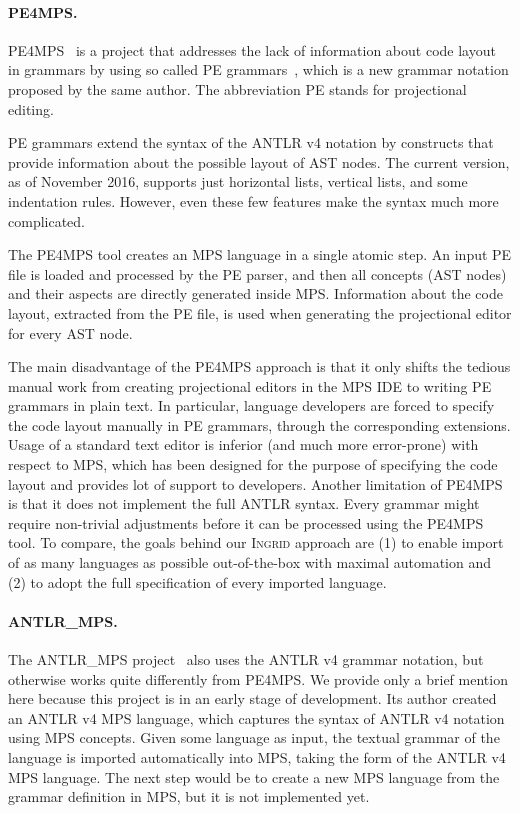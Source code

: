 \paragraph{PE4MPS.}
PE4MPS~\cite{ref:PE4MPS} is a project that addresses the lack of information about code layout in grammars by using so called PE grammars~\cite{ref:PE}, which is a new grammar notation proposed by the same author.
The abbreviation PE stands for projectional editing.

PE grammars extend the syntax of the ANTLR v4 notation by constructs that provide information about the possible layout of AST nodes.
 The current version, as of November 2016, supports just horizontal lists, vertical lists, and some indentation rules.
However, even these few features make the syntax much more complicated.

The PE4MPS tool creates an MPS language in a single atomic step.
An input PE file is loaded and processed by the PE parser, and then all concepts (AST nodes) and their aspects are directly generated inside MPS.
Information about the code layout, extracted from the PE file, is used when generating the projectional editor for every AST node.

The main disadvantage of the PE4MPS approach is that it only shifts the tedious manual work from creating projectional editors in the MPS IDE to writing PE grammars in plain text.
In particular, language developers are forced to specify the code layout manually in PE grammars, through the corresponding extensions.
Usage of a standard text editor is inferior (and much more error-prone) with respect to MPS, which has been designed for the purpose of specifying the code layout and provides lot of support to developers.
Another limitation of PE4MPS is that it does not implement the full ANTLR syntax.
Every grammar might require non-trivial adjustments before it can be processed using the PE4MPS tool.
To compare, the goals behind our \textsc{Ingrid} approach are (1) to enable import of as many languages as possible out-of-the-box with maximal automation and (2) to adopt the full specification of every imported language.

\paragraph{ANTLR{\_}MPS.}
The ANTLR{\_}MPS project~\cite{ref:ANTLR2MPS} also uses the ANTLR v4 grammar notation, but otherwise works quite differently from PE4MPS.
We provide only a brief mention here because this project is in an early stage of development.
Its author created an ANTLR v4 MPS language, which captures the syntax of ANTLR v4 notation using MPS concepts.
Given some language as input, the textual grammar of the language is imported automatically into MPS, taking the form of the ANTLR v4 MPS language.
The next step would be to create a new MPS language from the grammar definition in MPS, but it is not implemented yet.

